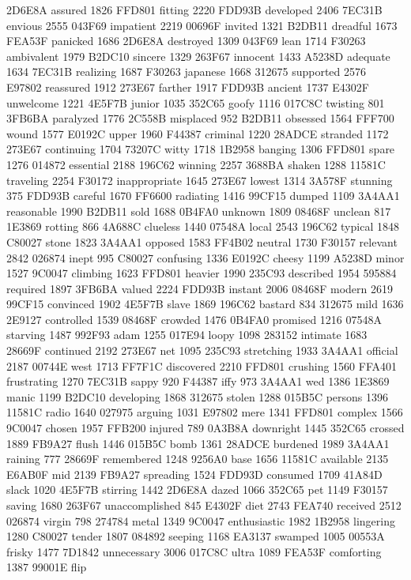 2D6E8A assured 1826 FFD801 fitting 2220 FDD93B developed 2406 7EC31B
envious 2555 043F69 impatient 2219 00696F invited 1321 B2DB11 dreadful
1673 FEA53F panicked 1686 2D6E8A destroyed 1309 043F69 lean 1714 F30263
ambivalent 1979 B2DC10 sincere 1329 263F67 innocent 1433 A5238D
adequate 1634 7EC31B realizing 1687 F30263 japanese 1668 312675
supported 2576 E97802 reassured 1912 273E67 farther 1917 FDD93B ancient
1737 E4302F unwelcome 1221 4E5F7B junior 1035 352C65 goofy 1116 017C8C
twisting 801 3FB6BA paralyzed 1776 2C558B misplaced 952 B2DB11 obsessed
1564 FFF700 wound 1577 E0192C upper 1960 F44387 criminal 1220 28ADCE
stranded 1172 273E67 continuing 1704 73207C witty 1718 1B2958 banging
1306 FFD801 spare 1276 014872 essential 2188 196C62 winning 2257 3688BA
shaken 1288 11581C traveling 2254 F30172 inappropriate 1645 273E67
lowest 1314 3A578F stunning 375 FDD93B careful 1670 FF6600 radiating
1416 99CF15 dumped 1109 3A4AA1 reasonable 1990 B2DB11 sold 1688 0B4FA0
unknown 1809 08468F unclean 817 1E3869 rotting 866 4A688C clueless 1440
07548A local 2543 196C62 typical 1848 C80027 stone 1823 3A4AA1 opposed
1583 FF4B02 neutral 1730 F30157 relevant 2842 026874 inept 995 C80027
confusing 1336 E0192C cheesy 1199 A5238D minor 1527 9C0047 climbing
1623 FFD801 heavier 1990 235C93 described 1954 595884 required 1897
3FB6BA valued 2224 FDD93B instant 2006 08468F modern 2619 99CF15
convinced 1902 4E5F7B slave 1869 196C62 bastard 834 312675 mild 1636
2E9127 controlled 1539 08468F crowded 1476 0B4FA0 promised 1216 07548A
starving 1487 992F93 adam 1255 017E94 loopy 1098 283152 intimate 1683
28669F continued 2192 273E67 net 1095 235C93 stretching 1933 3A4AA1
official 2187 00744E west 1713 FF7F1C discovered 2210 FFD801 crushing
1560 FFA401 frustrating 1270 7EC31B sappy 920 F44387 iffy 973 3A4AA1
wed 1386 1E3869 manic 1199 B2DC10 developing 1868 312675 stolen 1288
015B5C persons 1396 11581C radio 1640 027975 arguing 1031 E97802 mere
1341 FFD801 complex 1566 9C0047 chosen 1957 FFB200 injured 789 0A3B8A
downright 1445 352C65 crossed 1889 FB9A27 flush 1446 015B5C bomb 1361
28ADCE burdened 1989 3A4AA1 raining 777 28669F remembered 1248 9256A0
base 1656 11581C available 2135 E6AB0F mid 2139 FB9A27 spreading 1524
FDD93D consumed 1709 41A84D slack 1020 4E5F7B stirring 1442 2D6E8A
dazed 1066 352C65 pet 1149 F30157 saving 1680 263F67 unaccomplished 845
E4302F diet 2743 FEA740 received 2512 026874 virgin 798 274784 metal
1349 9C0047 enthusiastic 1982 1B2958 lingering 1280 C80027 tender 1807
084892 seeping 1168 EA3137 swamped 1005 00553A frisky 1477 7D1842
unnecessary 3006 017C8C ultra 1089 FEA53F comforting 1387 99001E flip
